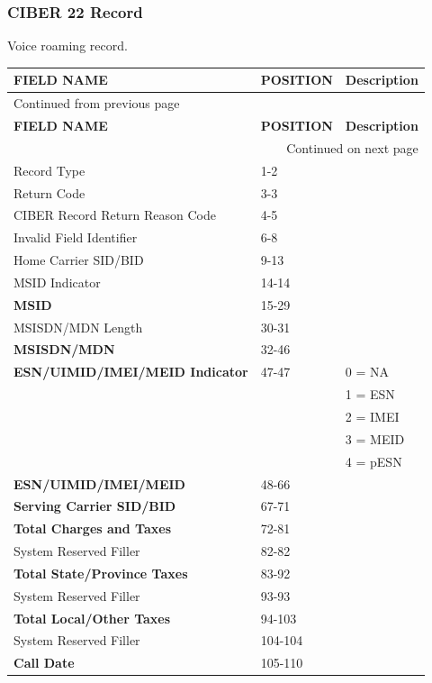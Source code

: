 \documentclass[12pt,twoside]{article}
\begin{document}
\normalsize
\newpage 
\subsubsection{CIBER 22 Record}
\label{sec:orgheadline20}
Voice roaming record.
\footnotesize

\begin{longtable}{l|l|l}
\hline
\textbf{FIELD NAME} & \textbf{POSITION} & \textbf{Description}\\
\hline
\endfirsthead
\multicolumn{3}{l}{Continued from previous page} \\
\hline

\textbf{FIELD NAME} & \textbf{POSITION} & \textbf{Description} \\

\hline
\endhead
\hline\multicolumn{3}{r}{Continued on next page} \\
\endfoot
\endlastfoot
\hline
Record Type & 1-2 & \\
Return Code & 3-3 & \\
CIBER Record Return Reason Code & 4-5 & \\
Invalid Field Identifier & 6-8 & \\
Home Carrier SID/BID & 9-13 & \\
MSID Indicator & 14-14 & \\
\textbf{MSID} & 15-29 & \\
MSISDN/MDN Length & 30-31 & \\
\textbf{MSISDN/MDN} & 32-46 & \\
\textbf{ESN/UIMID/IMEI/MEID Indicator} & 47-47 & 0 = NA\\
 &  & 1 = ESN\\
 &  & 2 = IMEI\\
 &  & 3 = MEID\\
 &  & 4 = pESN\\
\textbf{ESN/UIMID/IMEI/MEID} & 48-66 & \\
\textbf{Serving Carrier SID/BID} & 67-71 & \\
\textbf{Total Charges and Taxes} & 72-81 & \\
System Reserved Filler & 82-82 & \\
\textbf{Total State/Province Taxes} & 83-92 & \\
System Reserved Filler & 93-93 & \\
\textbf{Total Local/Other Taxes} & 94-103 & \\
System Reserved Filler & 104-104 & \\
\textbf{Call Date} & 105-110 & \\

\end{longtable}
\end{document}
